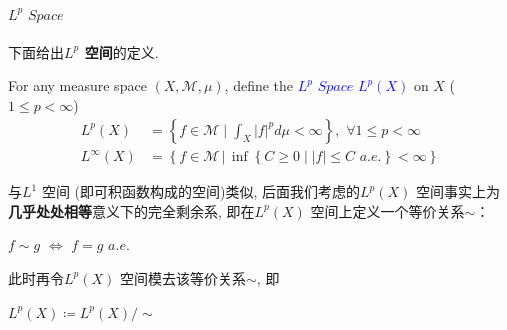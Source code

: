 \paragraph{$L^p \,\, Space$}
	下面给出\textbf{$L^p$ 空间}的定义.
	\begin{defn}\label{def 1.1.3}
		For any measure space $(X , \mathcal{M} , \mu)$, define the \underline{\textcolor{blue}{\textbf{$L^p \,\, Space \,\, L^{p}(X)$}}} on $X$ ($1 \leq p < \infty$)
		\begin{align}
			L^{p}(X) &= \left\{ f \in \mathcal{M} \mid \int_{X}{\left| f \right|^p d \mu} < \infty \right\} , \,\, \forall 1 \leq p < \infty\\
			L^{\infty}(X) &= \left\{ f \in \mathcal{M} \, \Big| \, \inf{\left\{ C \geq 0 \mid \left| f \right| \leq C \,\, a.e. \right\}} < \infty \right\}
		\end{align}
		
		\vspace{2em}
		\begin{rmk}
			与$L^1$ 空间 (即可积函数构成的空间)类似, 后面我们考虑的$L^{p}(X)$ 空间事实上为\textbf{几乎处处相等}意义下的完全剩余系, 即在$L^{p}(X)$ 空间上定义一个等价关系$\sim$：
			\begin{center}
				$f \sim g \,\, \Leftrightarrow \,\, f = g \,\, a.e.$
			\end{center}
			此时再令$L^{p}(X)$ 空间模去该等价关系$\sim$, 即
			\begin{center}
				$L^{p}(X) \coloneqq L^{p}(X) / \sim$
			\end{center}
		\end{rmk}
	\end{defn}

\newpage

